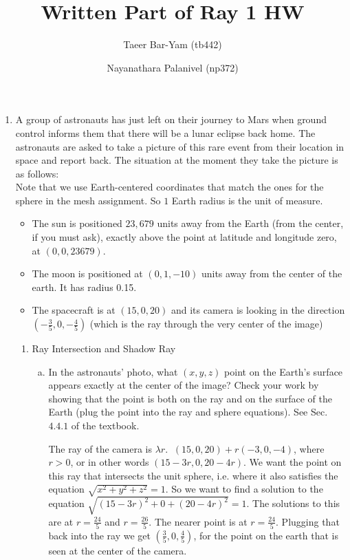 \documentclass[11pt, oneside]{article}
\title{Written Part of Ray 1 HW}
\author{Taeer Bar-Yam (tb442) \and Nayanathara Palanivel (np372)}
\begin{document}
\maketitle
\begin{enumerate}[Q1.]
  \item A group of astronauts has just left on their journey to Mars when ground control informs them that there will be a lunar eclipse back home. The astronauts are asked to take a picture of this rare event from their location in space and report back. The situation at the moment they take the picture is as follows:\\
Note that we use Earth-centered coordinates that match the ones for the sphere in the mesh assignment. So $1$ Earth radius is the unit of measure.
\begin{itemize}
  \item The sun is positioned $23,679$ units away from the Earth (from the center, if you must ask), exactly above the point at latitude and longitude zero, at $(0, 0, 23679)$.
  \item The moon is positioned at $(0, 1, -10)$ units away from the center of the earth. It has radius 0.15.
  \item The spacecraft is at $(15, 0, 20)$ and its camera is looking in the direction $\left(-\frac 3 5, 0, -\frac 4 5\right)$ (which is the ray through the very center of the image)
\end{itemize}
  \begin{enumerate}[1)]
    \item Ray Intersection and Shadow Ray
    \begin{enumerate}[a.]
      \item In the astronauts' photo, what $(x, y, z)$ point on the Earth's surface appears exactly at the center of the image? Check your work by showing that the point is both on the ray and on the surface of the Earth (plug the point into the ray and sphere equations). See Sec. $4.4.1$ of the textbook.
       
        The ray of the camera is $\lambda r.\;\;(15,0,20) + r(-3, 0, -4)$, where $r>0$, or in other words $(15-3r, 0, 20-4r)$. We want the point on this ray that intersects the unit sphere, i.e. where it also satisfies the equation $\sqrt{x^2+y^2+z^2}=1$. So we want to find a solution to the equation $\sqrt{{(15-3r)}^2 + 0 + {(20-4r)}^2}=1$. The solutions to this are at $r=\frac{24}{5}$ and $r=\frac{26}{5}$. The nearer point is at $r=\frac{24}{5}$. Plugging that back into the ray we get $\left(\frac 3 5, 0, \frac{4}{5}\right)$, for the point on the earth that is seen at the center of the camera.


\end{enumerate}
\end{enumerate}
\end{enumerate}
\end{document}
